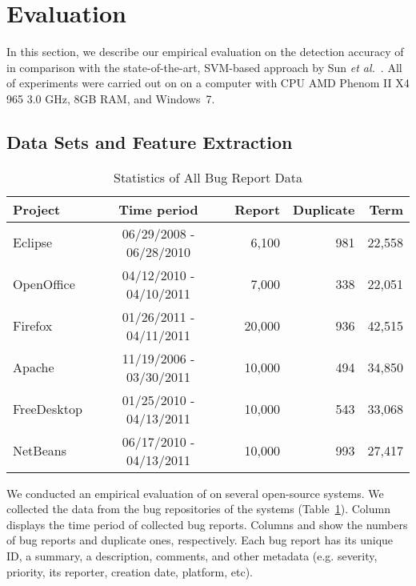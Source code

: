 \section{Evaluation}
\label{eval}

In this section, we describe our empirical evaluation on the detection
accuracy of {\model} in comparison with the state-of-the-art,
SVM-based approach by Sun {\em et al.}~\cite{davidlo10}. All of
experiments were carried out on on a computer with CPU AMD Phenom II
X4 965 3.0 GHz, 8GB RAM, and Windows~7.


\subsection{Data Sets and Feature Extraction}

\begin{table}[t]
\centering
\caption{Statistics of All Bug Report Data}
    \begin{tabular}{lcrrr}
    \hline
    Project &  Time period &  Report &  Duplicate &  Term \\
    \hline
    Eclipse  &  06/29/2008 - 06/28/2010 & 6,100 & 981 & 22,558 \\
    OpenOffice & 04/12/2010 - 04/10/2011 & 7,000 & 338 & 22,051 \\
    Firefox  &  01/26/2011 - 04/11/2011 & 20,000 & 936 & 42,515 \\
    Apache  &  11/19/2006 - 03/30/2011 & 10,000 & 494   & 34,850 \\
    FreeDesktop &  01/25/2010 - 04/13/2011 & 10,000 & 543   & 33,068 \\
    NetBeans    & 06/17/2010 - 04/13/2011 & 10,000 & 993 & 27,417\\
    \hline
    \end{tabular}%
\label{data}
\end{table}

We conducted an empirical evaluation of {\model} on several
open-source systems. We collected the data from the bug repositories
of the systems (Table~\ref{data}). Column  displays
the time period of collected bug reports. Columns  and
 show the numbers of bug reports and duplicate ones,
respectively.
Each bug report has its unique ID, a summary, a description, comments,
and other metadata (e.g. severity, priority, its reporter, creation
date, platform, etc).


